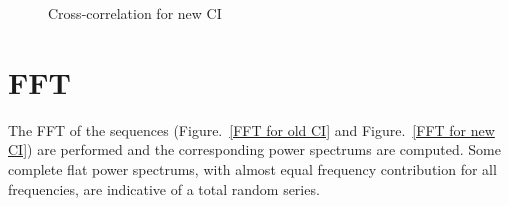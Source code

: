 \begin{figure}
 \hspace{0.5cm}
\caption{Cross-correlation for new CI}
\label{intercorr for new CI}
\end{figure}
\section{FFT}

The FFT of the sequences (Figure.~\ref{FFT for old CI} and Figure.~\ref{FFT for new CI}) are performed and the corresponding power spectrums are computed. Some complete flat power spectrums, with almost equal frequency contribution for all frequencies, are indicative of a total random series.

